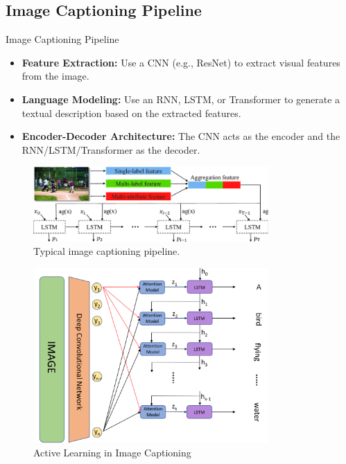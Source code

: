 \subsection{Image Captioning Pipeline}
\begin{frame}[allowframebreaks]{Image Captioning Pipeline}
    \begin{itemize}
        \item \textbf{Feature Extraction:} Use a CNN (e.g., ResNet) to extract visual features from the image.
        \item \textbf{Language Modeling:} Use an RNN, LSTM, or Transformer to generate a textual description based on the extracted features.
        \item \textbf{Encoder-Decoder Architecture:} The CNN acts as the encoder and the RNN/LSTM/Transformer as the decoder.
    \end{itemize}
    \begin{figure}
        \centering
        \includegraphics[width=0.8\textwidth]{images/vision+text/captioning-pipeline.png}
        \caption*{Typical image captioning pipeline.}
    \end{figure}
\framebreak
    \begin{figure}
        \centering
        \includegraphics[width=0.8\textwidth,height=0.8\textheight,keepaspectratio]{images/vision+text/captioning-active-learning.png}
        \caption*{Active Learning in Image Captioning}
    \end{figure}
\end{frame}

